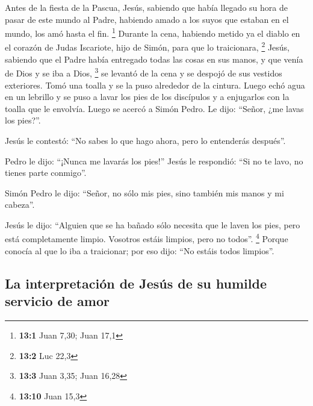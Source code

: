  Antes de la fiesta de la Pascua, Jesús, sabiendo que
había llegado su hora de pasar de este mundo al Padre, habiendo amado a
los suyos que estaban en el mundo, los amó hasta el fin. \footnote{\textbf{13:1}
  Juan 7,30; Juan 17,1}  Durante la cena, habiendo metido
ya el diablo en el corazón de Judas Iscariote, hijo de Simón, para que
lo traicionara, \footnote{\textbf{13:2} Luc 22,3}  Jesús,
sabiendo que el Padre había entregado todas las cosas en sus manos, y
que venía de Dios y se iba a Dios, \footnote{\textbf{13:3} Juan 3,35;
  Juan 16,28}  se levantó de la cena y se despojó de sus
vestidos exteriores. Tomó una toalla y se la puso alrededor de la
cintura.  Luego echó agua en un lebrillo y se puso a lavar
los pies de los discípulos y a enjugarlos con la toalla que le envolvía.
 Luego se acercó a Simón Pedro. Le dijo: ``Señor, ¿me
lavas los pies?''.

 Jesús le contestó: ``No sabes lo que hago ahora, pero lo
entenderás después''.

 Pedro le dijo: ``¡Nunca me lavarás los pies!'' Jesús le
respondió: ``Si no te lavo, no tienes parte conmigo''.

 Simón Pedro le dijo: ``Señor, no sólo mis pies, sino
también mis manos y mi cabeza''.

 Jesús le dijo: ``Alguien que se ha bañado sólo necesita
que le laven los pies, pero está completamente limpio. Vosotros estáis
limpios, pero no todos''. \footnote{\textbf{13:10} Juan 15,3}
 Porque conocía al que lo iba a traicionar; por eso dijo:
``No estáis todos limpios''.

\hypertarget{la-interpretaciuxf3n-de-jesuxfas-de-su-humilde-servicio-de-amor}{%
\subsection{La interpretación de Jesús de su humilde servicio de
amor}\label{la-interpretaciuxf3n-de-jesuxfas-de-su-humilde-servicio-de-amor}}

